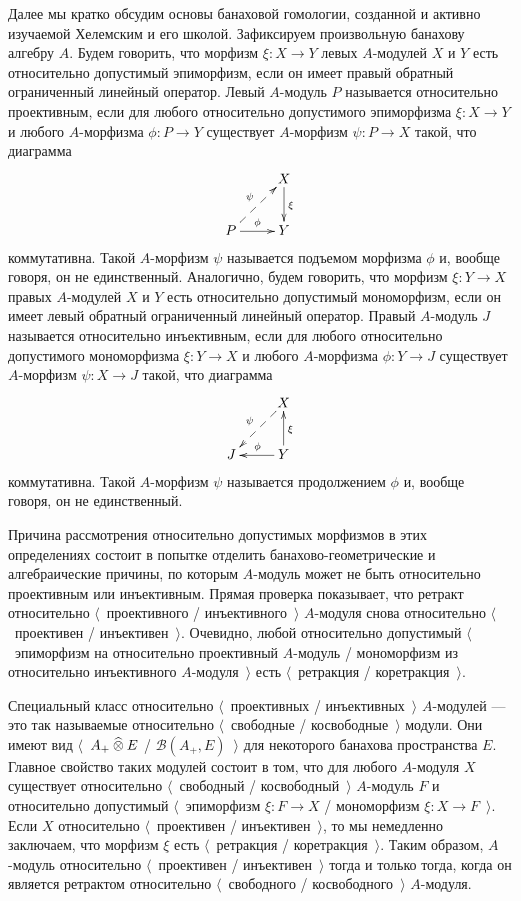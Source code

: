 Далее мы кратко обсудим основы банаховой гомологии, созданной и активно
изучаемой Хелемским и его школой. Зафиксируем произвольную банахову алгебру $A$.
Будем говорить, что морфизм $\xi:X\to Y$ левых $A$-модулей $X$ и $Y$ есть
относительно допустимый эпиморфизм, если он имеет правый обратный ограниченный
линейный оператор. Левый $A$-модуль $P$ называется относительно проективным,
если для любого относительно допустимого эпиморфизма $\xi:X\to Y$ и любого
$A$-морфизма $\phi:P\to Y$ существует $A$-морфизм $\psi:P\to X$ такой, что
диаграмма
$$
\xymatrix{
& {X} \ar[d]^{\xi}\\  %
{P} \ar@{-->}[ur]^{\psi} \ar[r]^{\phi} &{Y}}  %
$$
коммутативна. Такой $A$-морфизм $\psi$ называется подъемом морфизма $\phi$ и,
вообще говоря, он не единственный. Аналогично, будем говорить, что морфизм
$\xi:Y\to X$ правых $A$-модулей $X$ и $Y$ есть относительно допустимый
мономорфизм, если он имеет левый обратный ограниченный линейный оператор. Правый
$A$-модуль $J$ называется относительно инъективным, если для любого относительно
допустимого мономорфизма $\xi:Y\to X$ и любого $A$-морфизма $\phi:Y\to J$
существует $A$-морфизм $\psi:X\to J$ такой, что диаграмма
$$
\xymatrix{
& {X} \ar@{-->}[dl]_{\psi} \\  %
{J} &{Y} \ar[l]_{\phi} \ar[u]_{\xi}}  %
$$
коммутативна. Такой $A$-морфизм $\psi$ называется продолжением $\phi$ и, вообще
говоря, он не единственный.

Причина рассмотрения относительно допустимых морфизмов в этих определениях
состоит в попытке отделить банахово-геометрические и алгебраические причины, по
которым $A$-модуль может не быть относительно проективным или инъективным.
Прямая проверка показывает, что ретракт относительно $\langle$~проективного /
инъективного~$\rangle$ $A$-модуля снова относительно $\langle$~проективен /
инъективен~$\rangle$. Очевидно, любой относительно допустимый
$\langle$~эпиморфизм на относительно проективный $A$-модуль / мономорфизм из
относительно инъективного $A$-модуля~$\rangle$ есть $\langle$~ретракция /
коретракция~$\rangle$.

Специальный класс относительно $\langle$~проективных / инъективных~$\rangle$
$A$-модулей --- это так называемые относительно $\langle$~свободные /
косвободные~$\rangle$ модули. Они имеют вид $\langle$~$A_+\mathbin{\widehat{\otimes}} E$ /
$\mathcal{B}(A_+,E)$~$\rangle$ для некоторого банахова пространства $E$. Главное
свойство таких модулей состоит в том, что для любого $A$-модуля $X$ существует
относительно $\langle$~свободный / косвободный~$\rangle$ $A$-модуль $F$ и
относительно допустимый $\langle$~эпиморфизм $\xi:F\to X$ / мономорфизм
$\xi:X\to F$~$\rangle$. Если $X$ относительно $\langle$~проективен /
инъективен~$\rangle$, то мы немедленно заключаем, что морфизм $\xi$ есть
$\langle$~ретракция / коретракция~$\rangle$. Таким образом, $A$-модуль
относительно $\langle$~проективен / инъективен~$\rangle$ тогда и только тогда,
когда он является ретрактом относительно $\langle$~свободного /
косвободного~$\rangle$ $A$-модуля. 

